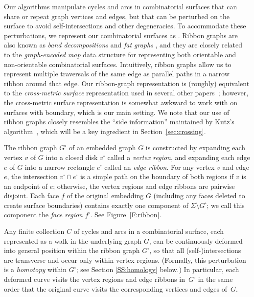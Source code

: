 \documentclass[letterpaper,review]{siamart190516}
\begin{document}
Our algorithms manipulate cycles and arcs in combinatorial surfaces that can share or repeat graph vertices and edges, but that can be perturbed on the surface to avoid self-intersections and other degeneracies.  To accommodate these perturbations, we represent our combinatorial surfaces as  \cite{l-gos-2004,em-gos-13}.  Ribbon graphs are also known as \emph{band decompositions} \cite{em-gos-13} and \emph{fat graphs} \cite{l-gos-2004}, and they are closely related to the \emph{graph-encoded map} data structure \cite{l-gem-82} for representing both orientable and non-orientable combinatorial surfaces.  Intuitively, ribbon graphs allow us to represent multiple traversals of the same edge as parallel paths in a narrow ribbon around that edge.  Our ribbon-graph representation is (roughly) equivalent to the \emph{cross-metric surface} representation used in several other papers~\cite{ce-tspcs-06,cl-opdsh-07,ccelw-scsih-08}; however, the cross-metric surface representation is somewhat awkward to work with on surfaces with boundary, which is our main setting.  We note that our use of ribbon graphs closely resembles the “side information” maintained by Kutz's algorithm~\cite[Section 4.1]{k-csnco-06}, which will be a key ingredient in Section~\ref{sec:crossing}. 

The ribbon graph $G^\square$ of an embedded graph $G$ is constructed by expanding each vertex $v$ of $G$ into a closed disk $v^\square$ called a \emph{vertex region}, and expanding each edge $e$ of $G$ into a narrow rectangle $e^\square$ called an \emph{edge ribbon}.  For any vertex $v$ and edge $e$, the intersection $v^\square\cap e^\square$ is a simple path on the boundary of both regions if $v$ is an endpoint of $e$; otherwise, the vertex regions and edge ribbons are pairwise disjoint.  Each face $f$ of the original embedding $G$ (including any faces deleted to create surface boundaries) contains exactly one component of $\Sigma\setminus G^\square$; we call this component the \emph{face region} $f^\square$.  See Figure~\ref{F:ribbon}.

Any finite collection $C$ of cycles and arcs in a combinatorial surface, each represented as a walk in the underlying graph $G$, can be continuously deformed into general position within the ribbon graph $G^\square$, so that all (self-)intersections are transverse and occur only within vertex regions.  (Formally, this perturbation is a \emph{homotopy} within $G^\square$; see Section \ref{SS:homology} below.)  In particular, each deformed curve visits the vertex regions and edge ribbons in~$G^\square$ in the same order that the original curve visits the corresponding vertices and edges of~$G$.
\end{document}
